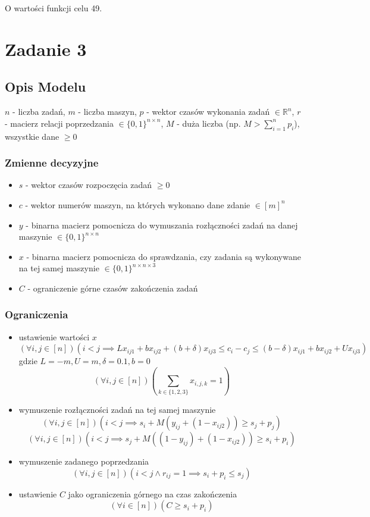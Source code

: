 \documentclass{article}
\begin{document}
O wartości funkcji celu 49.

\section{Zadanie 3}
\subsection{Opis Modelu}
$n$ - liczba zadań, $m$ - liczba maszyn, $p$ - wektor czasów wykonania zadań $\in \mathbb{R}^n$, $r$ - macierz relacji poprzedzania $\in \{0,1\}^{n\times n}$, $M$ - duża liczba (np. $M > \sum_{i=1}^{n}{p_i}$), wszystkie dane $\geq 0$

\subsubsection{Zmienne decyzyjne}
\begin{itemize}
	\item $s$ - wektor czasów rozpoczęcia zadań $\geq 0$
	\item $c$ - wektor numerów maszyn, na których wykonano dane zdanie $\in [m]^n$
	\item $y$ - binarna macierz pomocnicza do wymuszania rozłączności zadań na danej maszynie $\in \{0,1\}^{n\times n}$
	\item $x$ - binarna macierz pomocnicza do sprawdzania, czy zadania są wykonywane na tej samej maszynie $\in \{0,1\}^{n\times n\times 3}$
	\item $C$ - ograniczenie górne czasów zakończenia zadań
\end{itemize}

\subsubsection{Ograniczenia}
\begin{itemize}
	\item ustawienie wartości $x$
	\[(\forall i,j \in [n])\left(i < j \implies Lx_{ij1} + bx_{ij2} + (b+\delta)x_{ij3} \leq c_i - c_j \leq (b-\delta)x_{ij1} + bx_{ij2}  + Ux_{ij3}\right)\] gdzie $L=-m, U=m, \delta=0.1, b=0$
	\[(\forall i,j \in [n])\left(\sum_{k\in \{1,2,3\}}{x_{i,j,k}} = 1\right)\]
	\item wymuszenie rozłączności zadań na tej samej maszynie
	\[(\forall i,j \in [n])\left(i < j \implies s_i + M(y_{ij} + (1-x_{ij2})) \geq s_j + p_j\right)\]
	\[(\forall i,j \in [n])\left(i < j \implies s_j + M((1-y_{ij}) + (1-x_{ij2})) \geq s_i + p_i\right)\]
	\item wymuszenie zadanego poprzedzania
	\[(\forall i,j \in [n])\left(i < j \land r_{ij} = 1 \implies s_i + p_i \leq s_j\right)\]
	\item ustawienie $C$ jako ograniczenia górnego na czas zakończenia
	\[(\forall i \in [n])\left(C \geq s_i + p_i\right)\]
\end{itemize}
\end{document}
